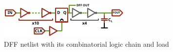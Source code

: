 
\begin{figure}[h]
	\centering
	\includegraphics[width=\columnwidth]{./figures/dff_ivx_chain_3.pdf}
	\caption{DFF netlist with its combinatorial logic chain and load}
	\label{dffchain}
\end{figure}
